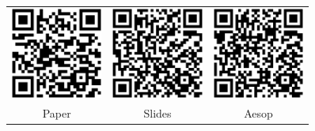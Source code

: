 \begin{frame}
  \centering
  {\Huge {}}

  \bigskip

  \begin{tabular}{ccc}
    \includegraphics[width=3cm]{images/qrcode-paper} & \includegraphics[width=3cm]{images/qrcode-slides} & \includegraphics[width=3cm]{images/qrcode-aesop} \\
    Paper & Slides & Aesop
  \end{tabular}
\end{frame}


